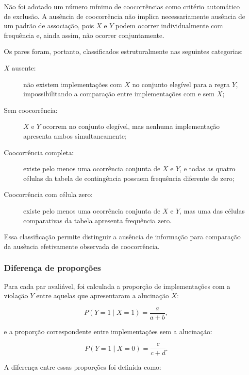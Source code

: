 Não foi adotado um número mínimo de coocorrências como critério
automático de exclusão. A ausência de coocorrência não implica
necessariamente ausência de um padrão de associação, pois $X$ e $Y$
podem ocorrer individualmente com frequência e, ainda assim, não
ocorrer conjuntamente.

Os pares foram, portanto, classificados estruturalmente nas seguintes
categorias:

\begin{description}

    \item[$X$ ausente:]
    não existem implementações com $X$ no conjunto elegível para a
    regra $Y$, impossibilitando a comparação entre implementações com
    e sem $X$;

    \item[Sem coocorrência:]
    $X$ e $Y$ ocorrem no conjunto elegível, mas nenhuma implementação
    apresenta ambos simultaneamente;

    \item[Coocorrência completa:]
    existe pelo menos uma ocorrência conjunta de $X$ e $Y$, e todas
    as quatro células da tabela de contingência possuem frequência
    diferente de zero;

    \item[Coocorrência com célula zero:]
    existe pelo menos uma ocorrência conjunta de $X$ e $Y$, mas uma
    das células comparativas da tabela apresenta frequência zero.

\end{description}

Essa classificação permite distinguir a ausência de informação para
comparação da ausência efetivamente observada de coocorrência.

\subsubsection{Diferença de proporções}

Para cada par avaliável, foi calculada a proporção de implementações com a violação $Y$ entre aquelas que apresentaram a alucinação $X$:

\[
P(Y=1\mid X=1)
=
\frac{a}{a+b},
\]

e a proporção correspondente entre implementações sem a alucinação:

\[
P(Y=1\mid X=0)
=
\frac{c}{c+d}.
\]

A diferença entre essas proporções foi definida como:

